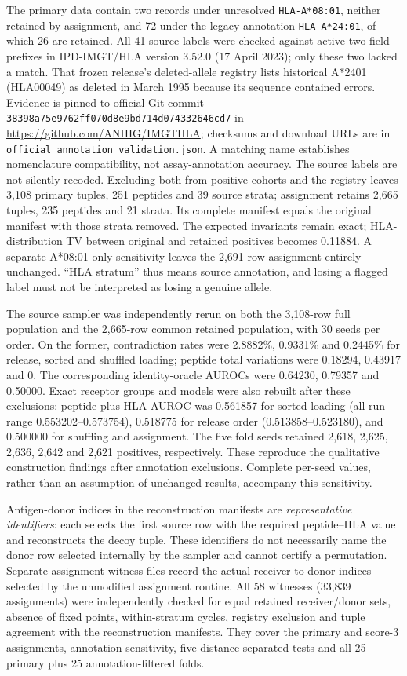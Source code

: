 \documentclass[11pt,a4paper]{article}
\begin{document}
The primary data contain two records under unresolved \texttt{HLA-A*08:01}, neither retained by assignment, and 72 under the legacy annotation \texttt{HLA-A*24:01}, of which 26 are retained. All 41 source labels were checked against active two-field prefixes in IPD-IMGT/HLA version 3.52.0 (17 April 2023); only these two lacked a match. That frozen release's deleted-allele registry lists historical A*2401 (HLA00049) as deleted in March 1995 because its sequence contained errors. Evidence is pinned to official Git commit \texttt{38398a75e9762ff070d8e9bd714d074332646cd7} in \url{https://github.com/ANHIG/IMGTHLA}; checksums and download URLs are in \texttt{official\_annotation\_validation.json}. A matching name establishes nomenclature compatibility, not assay-annotation accuracy. The source labels are not silently recoded. Excluding both from positive cohorts and the registry leaves 3,108 primary tuples, 251 peptides and 39 source strata; assignment retains 2,665 tuples, 235 peptides and 21 strata. Its complete manifest equals the original manifest with those strata removed. The expected invariants remain exact; HLA-distribution TV between original and retained positives becomes 0.11884. A separate A*08:01-only sensitivity leaves the 2,691-row assignment entirely unchanged. ``HLA stratum'' thus means source annotation, and losing a flagged label must not be interpreted as losing a genuine allele.

The source sampler was independently rerun on both the 3,108-row full population and the 2,665-row common retained population, with 30 seeds per order. On the former, contradiction rates were 2.8882\%, 0.9331\% and 0.2445\% for release, sorted and shuffled loading; peptide total variations were 0.18294, 0.43917 and 0. The corresponding identity-oracle AUROCs were 0.64230, 0.79357 and 0.50000. Exact receptor groups and models were also rebuilt after these exclusions: peptide-plus-HLA AUROC was 0.561857 for sorted loading (all-run range 0.553202--0.573754), 0.518775 for release order (0.513858--0.523180), and 0.500000 for shuffling and assignment. The five fold seeds retained 2,618, 2,625, 2,636, 2,642 and 2,621 positives, respectively. These reproduce the qualitative construction findings after annotation exclusions. Complete per-seed values, rather than an assumption of unchanged results, accompany this sensitivity.

Antigen-donor indices in the reconstruction manifests are \emph{representative identifiers}: each selects the first source row with the required peptide--HLA value and reconstructs the decoy tuple. These identifiers do not necessarily name the donor row selected internally by the sampler and cannot certify a permutation. Separate assignment-witness files record the actual receiver-to-donor indices selected by the unmodified assignment routine. All 58 witnesses (33,839 assignments) were independently checked for equal retained receiver/donor sets, absence of fixed points, within-stratum cycles, registry exclusion and tuple agreement with the reconstruction manifests. They cover the primary and score-3 assignments, annotation sensitivity, five distance-separated tests and all 25 primary plus 25 annotation-filtered folds.
\end{document}
